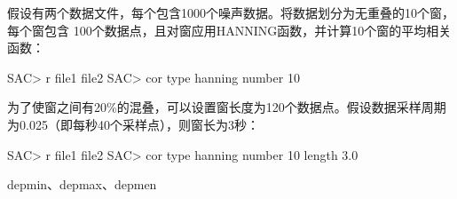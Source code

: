 假设有两个数据文件，每个包含1000个噪声数据。将数据划分为无重叠的10个窗，每个窗包含
100个数据点，且对窗应用HANNING函数，并计算10个窗的平均相关函数：
\begin{SACCode}
SAC> r file1 file2
SAC> cor type hanning number 10
\end{SACCode}

为了使窗之间有20\%的混叠，可以设置窗长度为120个数据点。假设数据采样周期为0.025（即每秒40个采样点），则窗长为3秒：
\begin{SACCode}
SAC> r file1 file2
SAC> cor type hanning number 10 length 3.0
\end{SACCode}

depmin、depmax、depmen
